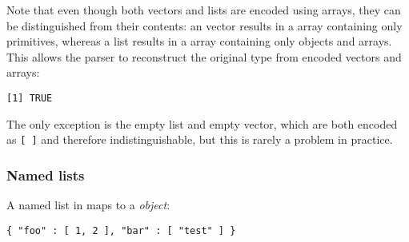 Note that even though both vectors and lists are encoded using \JSON arrays, they can be distinguished from their contents: an \R vector results in a \JSON array containing only primitives, whereas a list results in a \JSON array containing only objects and arrays. This allows the \JSON parser to reconstruct the original type from encoded vectors and arrays:

\begin{knitrout}\mycodesize
{}\color{fgcolor}\begin{kframe}
\begin{alltt}
 \hlkwb{<-} \hlstd{(}\hlstd{(}\hlstd{,} \hlstd{,} \hlstd{),} \hlstd{,} \hlstd{,} \hlstd{(} \hlstd{=} \hlstd{))}
\hlstd{(}\hlstd{(}
\end{alltt}
\begin{verbatim}
[1] TRUE
\end{verbatim}
\end{kframe}
\end{knitrout}


 The only exception is the empty list and empty vector, which are both encoded as \texttt{[ ]} and therefore indistinguishable, but this is rarely a problem in practice. 

\subsubsection{Named lists}

A named list in \R maps to a \JSON \emph{object}:

\begin{knitrout}\mycodesize
{}\color{fgcolor}\begin{kframe}
\begin{alltt}
\hlstd{(}\hlstd{(}\hlstd{(} \hlstd{=} \hlstd{(}\hlstd{,} \hlstd{),}  \hlstd{=} \hlstd{)))}
\end{alltt}
\begin{verbatim}
{ "foo" : [ 1, 2 ], "bar" : [ "test" ] }
\end{verbatim}
\end{kframe}
\end{knitrout}


